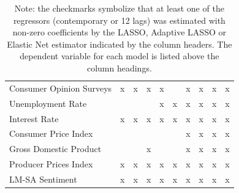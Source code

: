 \begin{landscape}
\begin{table}[]
\begin{adjustbox}{max width=\linewidth}
\begin{tabular}{llllllllll}
Consumer Opinion Surveys & x        & x                 & x             & x        &                  & x            & x       & x                & x            \\
Unemployment Rate        &          &                   &               & x        & x                & x            & x       & x                & x            \\
Interest Rate            & x        & x                 & x             & x        & x                & x            & x       & x                & x            \\
Consumer Price Index     &          &                   &               &          &                  & x            & x       & x                & x            \\
Gross Domestic Product   &          &                   & x             &          &                  & x            & x       & x                & x            \\
Producer Prices Index    & x        & x                 & x             & x        & x                & x            & x       & x                & x            \\ \hline
LM-SA Sentiment          & x        & x                 & x             & x        & x                & x            & x       & x                & x    \\ \hline     
\end{tabular}
\end{adjustbox}
\caption*{Note: the checkmarks symbolize that at least one of the regressors (contemporary or 12 lags) was estimated with non-zero coefficients by the LASSO, Adaptive LASSO or Elastic Net estimator indicated by the column headers. The dependent variable for each model is listed above the column headings.}
\end{table}
\end{landscape}


